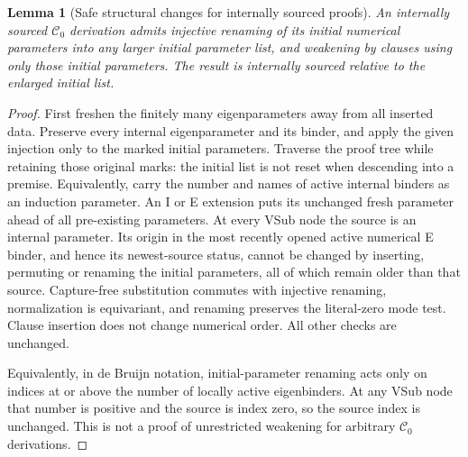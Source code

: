 \documentclass[11pt]{article}
\newtheorem{lemma}[theorem]{Lemma}
\theoremstyle{definition}
\theoremstyle{remark}
\begin{document}
\begin{lemma}[Safe structural changes for internally sourced proofs]
An internally sourced $\mathcal C_0$ derivation admits injective
renaming of its initial numerical parameters into any larger initial
parameter list, and weakening by clauses using only those initial
parameters. The result is internally sourced relative to the enlarged
initial list.
\end{lemma}
\begin{proof}
First freshen the finitely many eigenparameters away from all inserted
data. Preserve every internal eigenparameter and its binder, and apply
the given injection only to the marked initial parameters. Traverse
the proof tree while retaining those original marks: the initial list
is not reset when descending into a premise. Equivalently, carry
the number and names of active internal binders as an induction
parameter. An I or E extension puts its unchanged fresh parameter ahead of
all pre-existing parameters. At every VSub node the source is an
internal parameter. Its origin in the most recently opened active
numerical E binder, and hence its newest-source status, cannot be
changed by inserting, permuting or renaming the initial parameters,
all of which remain older than that source. Capture-free substitution
commutes with injective renaming, normalization is equivariant, and
renaming preserves the literal-zero mode test. Clause insertion does
not change numerical order. All other checks are unchanged.

Equivalently, in de Bruijn notation, initial-parameter renaming acts
only on indices at or above the number of locally active eigenbinders.
At any VSub node that number is positive and the source is index zero,
so the source index is unchanged. This is not a proof of unrestricted
weakening for arbitrary $\mathcal C_0$ derivations.
\end{proof}
\end{document}
